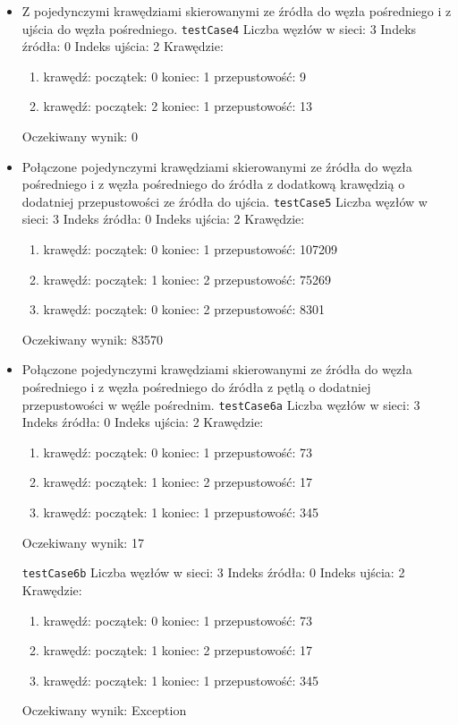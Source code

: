 \begin{itemize}[nosep]
    \item Z pojedynczymi krawędziami skierowanymi ze źródła do węzła pośredniego
    i z ujścia do węzła pośredniego.
    \texttt{testCase4}
    Liczba węzłów w sieci: 3
    Indeks źródła: 0
    Indeks ujścia: 2
    Krawędzie:
    \begin{enumerate}[nosep]
        \item krawędź:
        początek: 0
        koniec: 1
        przepustowość: 9
        \item krawędź:
        początek: 2
        koniec: 1
        przepustowość: 13
    \end{enumerate}
    Oczekiwany wynik: 0

    \item Połączone pojedynczymi krawędziami skierowanymi ze źródła do węzła
    pośredniego i z węzła pośredniego do źródła z dodatkową krawędzią o
    dodatniej przepustowości ze źródła do ujścia.
    \texttt{testCase5}
    Liczba węzłów w sieci: 3
    Indeks źródła: 0
    Indeks ujścia: 2
    Krawędzie:
    \begin{enumerate}[nosep]
        \item krawędź:
        początek: 0
        koniec: 1
        przepustowość: 107209
        \item krawędź:
        początek: 1
        koniec: 2
        przepustowość: 75269
        \item krawędź:
        początek: 0
        koniec: 2
        przepustowość: 8301
    \end{enumerate}
    Oczekiwany wynik: 83570

    \item Połączone pojedynczymi krawędziami skierowanymi ze źródła do węzła
    pośredniego i z węzła pośredniego do źródła z pętlą o dodatniej
    przepustowości w węźle pośrednim.
    \texttt{testCase6a}
    Liczba węzłów w sieci: 3
    Indeks źródła: 0
    Indeks ujścia: 2
    Krawędzie:
    \begin{enumerate}[nosep]
        \item krawędź:
        początek: 0
        koniec: 1
        przepustowość: 73
        \item krawędź:
        początek: 1
        koniec: 2
        przepustowość: 17
        \item krawędź:
        początek: 1
        koniec: 1
        przepustowość: 345
    \end{enumerate}
    Oczekiwany wynik: 17

    \texttt{testCase6b}
    Liczba węzłów w sieci: 3
    Indeks źródła: 0
    Indeks ujścia: 2
    Krawędzie:
    \begin{enumerate}[nosep]
        \item krawędź:
        początek: 0
        koniec: 1
        przepustowość: 73
        \item krawędź:
        początek: 1
        koniec: 2
        przepustowość: 17
        \item krawędź:
        początek: 1
        koniec: 1
        przepustowość: 345
    \end{enumerate}
    Oczekiwany wynik: Exception


\end{itemize}
